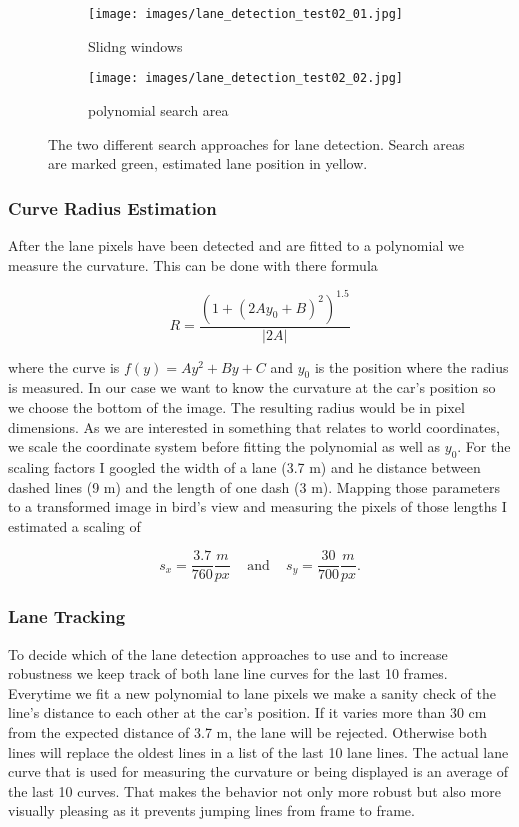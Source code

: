 \documentclass[a4paper, 11pt, DIV=14]{scrartcl}
\begin{document}
\begin{figure}[h]
    \centering
    \begin{subfigure}{0.45\textwidth}
        \texttt{[image: images/lane\_detection\_test02\_01.jpg]}
	\caption{Slidng windows}
	\label{fig:sliding_windows}
    \end{subfigure}\quad
    \begin{subfigure}{0.45\textwidth}
        \texttt{[image: images/lane\_detection\_test02\_02.jpg]}
    \caption{polynomial search area}
    \label{fig:polynomial_search}
    \end{subfigure} 
    \caption{The two different search approaches for lane detection. Search areas are marked green, estimated lane position in yellow.}  
    \label{fig:lane_detection}
\end{figure}

\subsubsection*{Curve Radius Estimation}
After the lane pixels have been detected and are fitted to a polynomial we measure the curvature. This can be done with there formula

$$ R = \frac{(1+(2Ay_0 + B)^2)^{1.5}}{|2A|}$$

where the curve is $f(y)= Ay^2 + By + C$ and $y_0$ is the position where the radius is measured. In our case we want to know the curvature at the car's position so we choose the bottom of the image. The resulting radius would be in pixel dimensions. As we are interested in something that relates to world coordinates, we scale the coordinate system before fitting the polynomial as well as $y_0$. For the scaling factors I googled the width of a lane (3.7 m) and he distance between dashed lines (9 m) and the length of one dash (3 m). Mapping those parameters to a transformed image in bird's view and measuring the pixels of those lengths I estimated a scaling of

 $$s_x = \frac{3.7}{760} \frac{m}{px}\;\;\; \text{ and } \;\;\;s_y = \frac{30}{700} \frac{m}{px}.$$
 
\subsubsection*{Lane Tracking}
To decide which of the lane detection approaches to use and to increase robustness we keep track of both lane line curves for the last 10 frames. Everytime we fit a new polynomial to lane pixels we make a sanity check of the line's distance to each other at the car's position. If it varies more than 30 cm from the expected distance of 3.7 m, the lane will be rejected. Otherwise both lines will replace the oldest lines in a list of the last 10 lane lines. The actual lane curve that is used for measuring the curvature or being displayed is an average of the last 10 curves. That makes the behavior not only more robust but also more visually pleasing as it prevents jumping lines from frame to frame.
\end{document}
